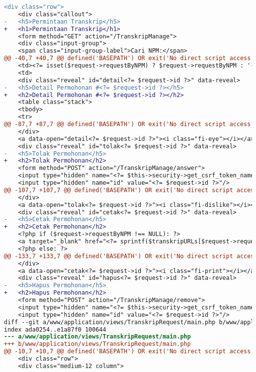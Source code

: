 \begin{itemize}
\begin{lstlisting}[frame=single, label={lst:perbaikan_1.3.1_tag_heading}, language=diff, caption=Perbaikan Kriteria Sukses 1.3.1 - Penggunaan \textit{Heading} Tidak Tepat]
    <div class="row">
    <div class="callout">
-   <h5>Permintaan Transkrip</h5>
+   <h1>Permintaan Transkrip</h1>
    <form method="GET" action="/TranskripManage">
    <div class="input-group">
    <span class="input-group-label">Cari NPM:</span>
@@ -40,7 +40,7 @@ defined('BASEPATH') OR exit('No direct script access allowed');
    <td><?= isset($request->requestByNPM) ? $request->requestByNPM : '-' ?></td>
    <td>
    <div class="reveal" id="detail<?= $request->id ?>" data-reveal>
-   <h5>Detail Permohonan #<?= $request->id ?></h5>
+   <h2>Detail Permohonan #<?= $request->id ?></h2>
    <table class="stack">
    <tbody>
    <tr>
@@ -87,7 +87,7 @@ defined('BASEPATH') OR exit('No direct script access allowed');
    </div>
    <a data-open="detail<?= $request->id ?>"><i class="fi-eye"></i></a>
    <div class="reveal" id="tolak<?= $request->id ?>" data-reveal>
-   <h5>Tolak Permohonan</h5>
+   <h2>Tolak Permohonan</h2>
    <form method="POST" action="/TranskripManage/answer">
    <input type="hidden" name="<?= $this->security->get_csrf_token_name() ?>" value="<?= $this->security->get_csrf_hash() ?>" />
    <input type="hidden" name="id" value="<?= $request->id ?>"/>
@@ -107,7 +107,7 @@ defined('BASEPATH') OR exit('No direct script access allowed');
    </div>
    <a data-open="tolak<?= $request->id ?>"><i class="fi-dislike"></i></a>
    <div class="reveal" id="cetak<?= $request->id ?>" data-reveal>
-   <h5>Cetak Permohonan</h5>
+   <h2>Cetak Permohonan</h2>
    <?php if ($request->requestByNPM !== NULL): ?>
    <a target="_blank" href="<?= sprintf($transkripURLs[$request->requestType], $request->requestByNPM) ?>">Klik untuk membuka DPS/LHS</a>
    <?php else: ?>
@@ -133,7 +133,7 @@ defined('BASEPATH') OR exit('No direct script access allowed');
    </div>
    <a data-open="cetak<?= $request->id ?>"><i class="fi-print"></i></a>
    <div class="reveal" id="hapus<?= $request->id ?>" data-reveal>
-   <h5>Hapus Permohonan</h5>
+   <h2>Hapus Permohonan</h2>
    <form method="POST" action="/TranskripManage/remove">
    <input type="hidden" name="<?= $this->security->get_csrf_token_name() ?>" value="<?= $this->security->get_csrf_hash() ?>" />
    <input type="hidden" name="id" value="<?= $request->id ?>"/>
diff --git a/www/application/views/TranskripRequest/main.php b/www/application/views/TranskripRequest/main.php
index ada0254..e1a87f0 100644
--- a/www/application/views/TranskripRequest/main.php
+++ b/www/application/views/TranskripRequest/main.php
@@ -10,7 +10,7 @@ defined('BASEPATH') OR exit('No direct script access allowed');
    <div class="row">
    <div class="medium-12 column">

\end{lstlisting}
\end{itemize}
